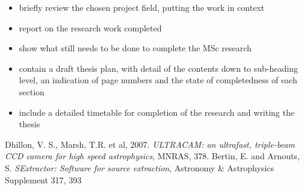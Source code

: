 \documentclass[a4paper,10pt]{article}
\begin{document}
\begin{itemize} 
\item briefly review the chosen project field, putting the work in context 
\item report on the research work completed 
\item show what still needs to be done to complete the MSc 
research 
\item contain a draft thesis plan, with detail of the 
contents down to sub-heading level, an indication of page numbers 
and the state of completedness of each section 
\item include a detailed timetable for completion of the research and writing the 
thesis \end{itemize}

\begin{thebibliography}{10}
	Dhillon, V. S., Marsh, T.R. et al, 2007. \emph{ULTRACAM: an ultrafast, triple-beam CCD camera for high speed astrophysics}, MNRAS, 378.
	Bertin, E. and {Arnouts}, S. \emph{SExtractor: Software for source extraction}, Astronomy \& Astrophysics Supplement 317, 393
\end{thebibliography}
\end{document}
